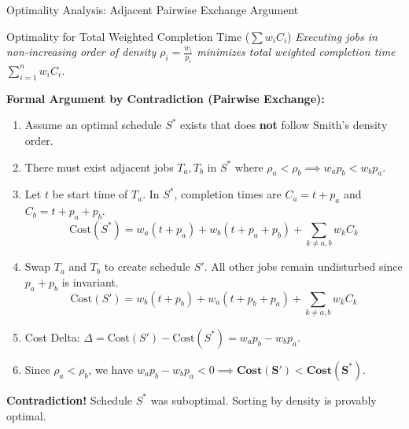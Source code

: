 \documentclass{beamer}
\begin{document}
\begin{frame}{Optimality Analysis: Adjacent Pairwise Exchange Argument}
  \begin{block}{Optimality for Total Weighted Completion Time ($\sum w_i C_i$)}
    \footnotesize
    \textit{Executing jobs in non-increasing order of density $\rho_i = \frac{w_i}{p_i}$ minimizes total weighted completion time $\sum_{i=1}^n w_i C_i$.}
  \end{block}

  \vspace{0.1cm}
  \footnotesize
  \textbf{Formal Argument by Contradiction (Pairwise Exchange):}
  \begin{enumerate}\itemsep2pt\tiny
    \item Assume an optimal schedule $S^*$ exists that does \textbf{not} follow Smith's density order.
    \item There must exist adjacent jobs $T_a, T_b$ in $S^*$ where $\rho_a < \rho_b \implies w_a p_b < w_b p_a$.
    \item Let $t$ be start time of $T_a$. In $S^*$, completion times are $C_a = t + p_a$ and $C_b = t + p_a + p_b$.
          $$\text{Cost}(S^*) = w_a(t + p_a) + w_b(t + p_a + p_b) + \sum_{k \ne a,b} w_k C_k$$
    \item Swap $T_a$ and $T_b$ to create schedule $S'$. All other jobs remain undisturbed since $p_a + p_b$ is invariant.
          $$\text{Cost}(S') = w_b(t + p_b) + w_a(t + p_b + p_a) + \sum_{k \ne a,b} w_k C_k$$
    \item Cost Delta: $\Delta = \text{Cost}(S') - \text{Cost}(S^*) = w_a p_b - w_b p_a$.
    \item Since $\rho_a < \rho_b$, we have $w_a p_b - w_b p_a < 0 \implies \mathbf{\text{Cost}(S') < \text{Cost}(S^*)}$.
  \end{enumerate}
  \vspace{-0.1cm}
  \begin{center}
    \scriptsize \textbf{Contradiction!} Schedule $S^*$ was suboptimal. Sorting by density is provably optimal.
  \end{center}
\end{frame}
\end{document}

